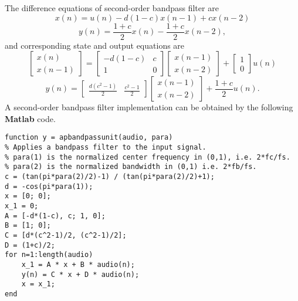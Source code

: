 \documentclass[10pt,a4paper,oneside]{article}
\begin{document}
The difference equations of second-order bandpass filter are
\[
x(n) = u(n) - d(1-c)x(n-1) + cx(n-2)
\]
\[
y(n) = \frac{1+c}{2}x(n) - \frac{1+c}{2}x(n-2),
\]
and corresponding state and output equations are
\[
\begin{bmatrix}x(n)\\x(n-1)\end{bmatrix} = \begin{bmatrix}
-d(1-c)&c\\
1&0
\end{bmatrix}
\begin{bmatrix}x(n-1)\\x(n-2)\end{bmatrix} + \begin{bmatrix}1\\0\end{bmatrix}
u(n)\]
\[
y(n) = \begin{bmatrix}\frac{d(c^2-1)}{2}&\frac{c^2-1}{2}\end{bmatrix}
\begin{bmatrix}x(n-1)\\x(n-2)\end{bmatrix} + \frac{1+c}{2}u(n).
\]
A second-order bandpass filter implementation can be obtained by the following {\bfseries Matlab} code.
\begin{lstlisting}
function y = apbandpassunit(audio, para)
% Applies a bandpass filter to the input signal.
% para(1) is the normalized center frequency in (0,1), i.e. 2*fc/fs.
% para(2) is the normalized bandwidth in (0,1) i.e. 2*fb/fs.
c = (tan(pi*para(2)/2)-1) / (tan(pi*para(2)/2)+1);
d = -cos(pi*para(1));
x = [0; 0];
x_1 = 0;
A = [-d*(1-c), c; 1, 0];
B = [1; 0];
C = [d*(c^2-1)/2, (c^2-1)/2];
D = (1+c)/2;
for n=1:length(audio)
	x_1 = A * x + B * audio(n);
	y(n) = C * x + D * audio(n);
	x = x_1;
end
\end{lstlisting}
\end{document}
